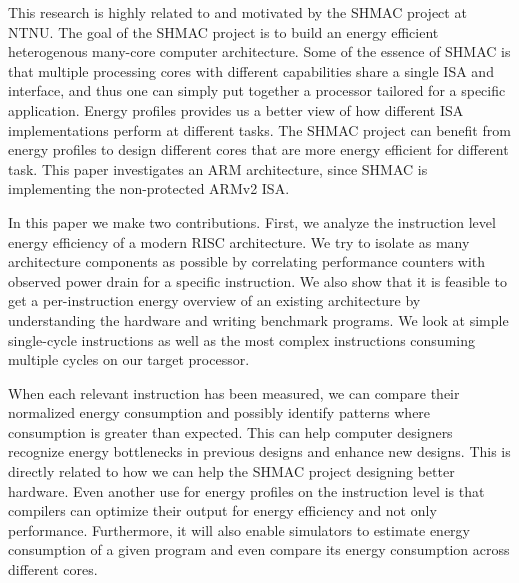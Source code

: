 This research is highly related to and motivated by the SHMAC
project\cite{Umuroglu662354}\cite{rusten2012implementing} at NTNU. The goal of
the SHMAC project is to build an energy efficient heterogenous many-core
computer architecture. Some of the essence of SHMAC is that multiple processing
cores with different capabilities share a single ISA and interface, and thus one
can simply put together a processor tailored for a specific application.  Energy
profiles provides us a better view of how different ISA implementations perform
at different tasks\cite{kumar2003single}. The SHMAC project can benefit from
energy profiles to design different cores that are more energy efficient for
different task. This paper investigates an ARM architecture, since SHMAC is
implementing the non-protected ARMv2 ISA.

In this paper we make two contributions. First, we analyze the instruction level
energy efficiency of a modern RISC architecture. We try to isolate as many
architecture components as possible by correlating performance counters with
observed power drain for a specific instruction. We also show that it is
feasible to get a per-instruction energy overview of an existing architecture by
understanding the hardware and writing benchmark programs. We look at simple
single-cycle instructions as well as the most complex instructions consuming
multiple cycles on our target processor.

When each relevant instruction has been measured, we can compare their
normalized energy consumption and possibly identify patterns where consumption
is greater than expected. This can help computer designers recognize energy
bottlenecks in previous designs and enhance new designs. This is directly
related to how we can help the SHMAC project designing better hardware. Even
another use for energy profiles on the instruction level is that compilers can
optimize their output for energy efficiency and not only performance.
Furthermore, it will also enable simulators to estimate energy consumption of a
given program and even compare its energy consumption across different cores.



